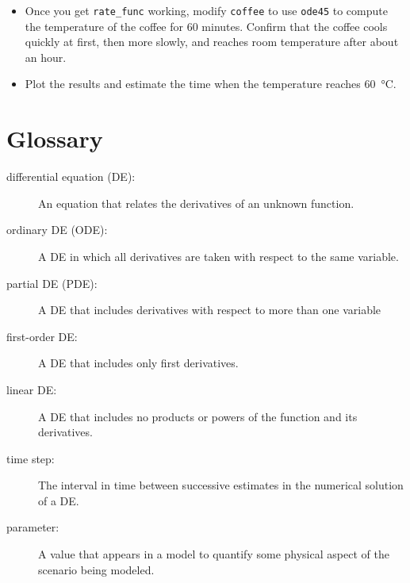 \begin{ex}
\begin{itemize}
\item Once you get \verb"rate_func" working, modify
{\tt coffee} to use {\tt ode45} to compute the temperature
of the coffee for 60 minutes.  Confirm that
the coffee cools quickly at first, then more slowly, and reaches
room temperature after about an hour.

\item Plot the results and estimate the time when the temperature reaches \SI{60}{\celsius}.

\end{itemize}

\end{ex}


\section{Glossary}

\begin{description}

\item[differential equation (DE):] An equation that relates the
derivatives of an unknown function.

\item[ordinary DE (ODE):] A DE in which all derivatives are taken with
respect to the same variable.

\item[partial DE (PDE):] A DE that includes derivatives with respect to
more than one variable

\item[first-order DE:] A DE that includes only first derivatives.

\item[linear DE:] A DE that includes no products or powers of the
function and its derivatives.

\item[time step:] The interval in time between successive estimates
in the numerical solution of a DE.

\item[parameter:] A value that appears in a model to quantify some
physical aspect of the scenario being modeled.

\end{description}

